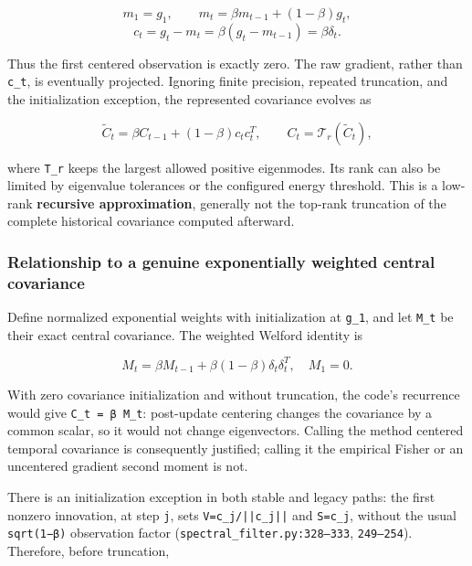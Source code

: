 \documentclass[
  british,
  10pt,
  a4paper,
]{article}
\begin{document}
\[
m_1=g_1,\qquad m_t=\beta m_{t-1}+(1-\beta)g_t,
\] \[
c_t=g_t-m_t=\beta(g_t-m_{t-1})=\beta\delta_t.
\]

Thus the first centered observation is exactly zero. The raw gradient,
rather than \texttt{c\_t}, is eventually projected. Ignoring finite
precision, repeated truncation,\allowbreak{} and the initialization
exception, the represented covariance evolves as

\[
\widetilde C_t=\beta C_{t-1}+(1-\beta)c_tc_t^T,\qquad
C_t=\mathcal T_r(\widetilde C_t),
\]

where \texttt{T\_r} keeps the largest allowed positive
eigenmodes.\allowbreak{} Its rank can also be limited by eigenvalue
tolerances or the configured energy threshold. This is a low-rank
\textbf{recursive approximation}, generally not the top-rank truncation
of the complete historical covariance computed afterward.

\subsubsection{Relationship to a genuine exponentially weighted central
covariance}\label{mathematical-audit--relationship-to-a-genuine-exponentially-weighted-central-covariance}

Define normalized exponential weights with initialization at
\texttt{g\_1}, and let \texttt{M\_t} be their exact central
covariance.\allowbreak{} The weighted Welford identity is

\[
M_t=\beta M_{t-1}+\beta(1-\beta)\delta_t\delta_t^T,\quad M_1=0.
\]

With zero covariance initialization and without truncation,\allowbreak{}
the code's recurrence would give
\texttt{C\_\allowbreak{}t \allowbreak{}=\allowbreak{} \allowbreak{}β \allowbreak{}M\_\allowbreak{}t}:
post-\allowbreak{}update centering changes the covariance by a common
scalar, so it would not change eigenvectors\allowbreak{}.\allowbreak{}
Calling the method centered temporal covariance is consequently
justified; calling it the empirical Fisher or an uncentered gradient
second moment is not.

There is an initialization exception in both stable and legacy paths:
the first nonzero innovation,\allowbreak{} at step \texttt{j}, sets
\texttt{V=\allowbreak{}c\_\allowbreak{}j/\allowbreak{}||c\_\allowbreak{}j||}
and \texttt{S=\textbar{}\textbar{}c\_j\textbar{}\textbar{}}, without the
usual \texttt{sqrt(1−β)} observation factor
(\texttt{spectral\_\allowbreak{}filter.\allowbreak{}py:\allowbreak{}328–333},
\texttt{249–254}). Therefore, before truncation,\allowbreak{}
\end{document}
